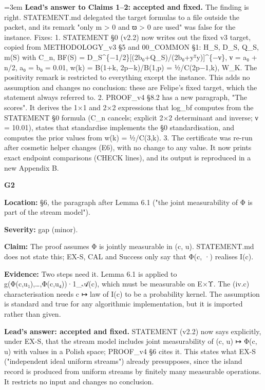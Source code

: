 \documentclass[11pt]{report}
\newenvironment{mdblock}{\begingroup\mdfont\raggedright\setlength{\parindent}{0pt}\setlength{\parskip}{0.55em}\emergencystretch=3em}{\par\endgroup}
\newenvironment{mdquote}{\begin{list}{}{\setlength{\leftmargin}{1.2em}\setlength{\rightmargin}{0pt}\setlength{\topsep}{2pt}\setlength{\parsep}{0.55em}\setlength{\itemsep}{0pt}}\item\relax}{\end{list}}
\newcommand{\mdhead}[2]{\par\vspace{0.7em}\noindent{\bfseries\ifcase#1\or\large\or\normalsize\or\normalsize\or\small\or\small\or\small\fi #2}\par\nopagebreak\vspace{0.1em}}
\begin{document}
\begin{mdblock}
\textbf{Lead's answer to Claims 1–2: accepted and fixed.} The finding is right. STATEMENT.md delegated the target formulas to a file outside the packet, and its remark "only m > 0 and ϖ > 0 are used" was false for the instance. Fixes: 1. STATEMENT §0 (v2.2) now writes out the fixed v3 target, copied from METHODOLOGY\_v3 §5 and 00\_COMMON §1: H\_S, D\_S, Q\_S, m(S) with C\_n, BF(S) = D\_S\textasciicircum{}\{−1/2\}[(2b₀+Q\_S)/(2b₀+yᵀy)]\textasciicircum{}\{−ν\}, ν = a₀ + n/2, a₀ = b₀ = 0.01, w(k) = B(1+k, 2p−k)/B(1,p) = ½/C(2p−1,k), W\_K. The positivity remark is restricted to everything except the instance. This adds no assumption and changes no conclusion: these are Felipe's fixed target, which the statement always referred to. 2. PROOF\_v4 §8.2 has a new paragraph, "The scores". It derives the 1×1 and 2×2 expressions that {\mdtt log\_\allowbreak{}bf} computes from the STATEMENT §0 formula (C\_n cancels; explicit 2×2 determinant and inverse; ν = 10.01), states that {\mdtt standardise} implements the §0 standardisation, and computes the prior values from w(k) = ½/C(3,k). 3. The certificate was re-run after cosmetic helper changes (E6), with no change to any value. It now prints exact endpoint comparisons (CHECK lines), and its output is reproduced in a new Appendix B.

\mdhead{2}{Claim 3 (Opus xhigh reviewer, G2, gap, minor)}

\begin{mdquote}
\textbf{G2}

\begin{mdbul}
\item \textbf{Location:} §6, the paragraph after Lemma 6.1 ("the joint measurability of Φ is part of the stream model").
\item \textbf{Severity:} gap (minor).
\item \textbf{Claim:} The proof assumes Φ is jointly measurable in (c, u). STATEMENT.md does not state this; EX-S, CAL and Success only say that Φ(c, ·) realises I(c).
\item \textbf{Evidence:} Two steps need it. Lemma 6.1 is applied to g(Φ(c,u₁),…,Φ(c,u₄))·1\_𝒜(c), which must be measurable on E×Υ. The (iv.c) characterisation needs c ↦ law of I(c) to be a probability kernel. The assumption is standard and true for any algorithmic implementation, but it is imported rather than given.
\end{mdbul}
\end{mdquote}

\textbf{Lead's answer: accepted and fixed.} STATEMENT (v2.2) now says explicitly, under EX-S, that the stream model includes joint measurability of (c, u) ↦ Φ(c, u) with values in a Polish space; PROOF\_v4 §6 cites it. This states what EX-S ("independent ideal uniform streams") already presupposes, since the island record is produced from uniform streams by finitely many measurable operations. It restricts no input and changes no conclusion.


\end{mdblock}
\end{document}
